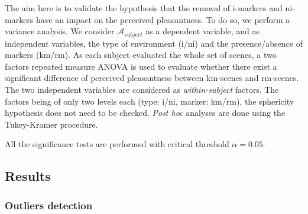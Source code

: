 \documentclass[12pt]{elsarticle}
\begin{document}

The aim here is to validate the hypothesis that the removal of i-markers and ni-markers have an impact on the perceived pleasantness. To do so, we perform a variance analysis. We consider $\mathcal{A}_{subject}$ as a dependent variable, and as independent variables, the type of environment (i/ni) and the presence/absence of markers (km/rm). As each subject evaluated the whole set of scenes, a two factors repeated measure ANOVA is used to evaluate whether there exist a significant difference of perceived pleasantness between km-scenes and rm-scenes. The two independent variables are considered as \emph{within-subject} factors. The factors being of only two levels each (type: i/ni,  marker: km/rm), the sphericity hypothesis does not need to be checked. \emph{Post hoc} analyses are done using the Tukey-Kramer procedure. %


All the significance tests are performed with critical threshold $\alpha=0.05$.

\subsection{Results}

\subsubsection{Outliers detection}
\end{document}
